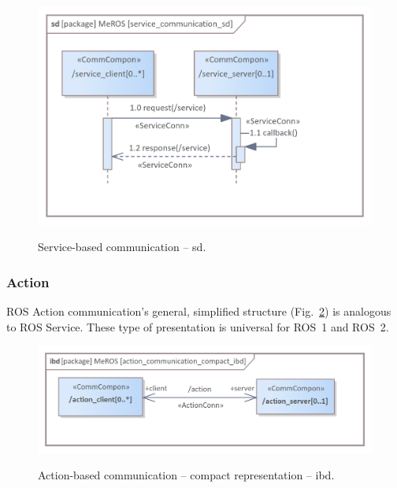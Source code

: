 \documentclass[11pt,oneside,a4paper]{article}
\begin{document}
	\begin{figure}[H]
		\centering
		\begin{center}
			{\includegraphics[scale=1.0]{img/meros_pkg/service_communication_sd.png}}
		\end{center}
		\caption{Service-based communication -- sd.} 
		\label{fig:service_communication_sd}
	\end{figure}
	
	
\subsubsection{Action}
\label{sec:metamodel-action}
	
	ROS Action communication's general, simplified structure (Fig.~\ref{fig:action_communication_compact_ibd}) is analogous to ROS Service. These type of presentation is universal for ROS~1 and ROS~2.
	

	\begin{figure}[H]
		\centering
		\begin{center}
			{\includegraphics[scale=1.0]{img/meros_pkg/action_communication_compact_ibd.png}}
		\end{center}
		\caption{Action-based communication -- compact representation -- ibd.} 
		\label{fig:action_communication_compact_ibd}
	\end{figure}
	
\end{document}
